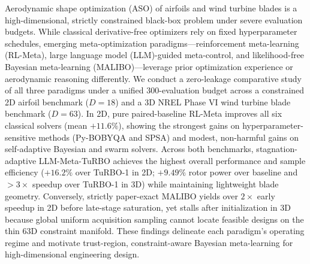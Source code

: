 \documentclass[11pt,fleqn,letterpaper]{article}
\begin{document}
\baselineskip \mybaselineskip
{}

\footnotesize\par{}\par\vspace*{1.2mm}
\baselineskip \mybaselineskip
Aerodynamic shape optimization (ASO) of airfoils and wind turbine blades is a high-dimensional, strictly constrained black-box problem under severe evaluation budgets. While classical derivative-free optimizers rely on fixed hyperparameter schedules, emerging meta-optimization paradigms---reinforcement meta-learning (RL-Meta), large language model (LLM)-guided meta-control, and likelihood-free Bayesian meta-learning (MALIBO)---leverage prior optimization experience or aerodynamic reasoning differently. We conduct a zero-leakage comparative study of all three paradigms under a unified 300-evaluation budget across a constrained 2D airfoil benchmark ($D=18$) and a 3D NREL Phase VI wind turbine blade benchmark ($D=63$). In 2D, pure paired-baseline RL-Meta improves all six classical solvers (mean $+11.6\%$), showing the strongest gains on hyperparameter-sensitive methods (Py-BOBYQA and SPSA) and modest, non-harmful gains on self-adaptive Bayesian and swarm solvers. Across both benchmarks, stagnation-adaptive LLM-Meta-TuRBO achieves the highest overall performance and sample efficiency ($+16.2\%$ over TuRBO-1 in 2D; $+9.49\%$ rotor power over baseline and $>3\times$ speedup over TuRBO-1 in 3D) while maintaining lightweight blade geometry. Conversely, strictly paper-exact MALIBO yields over $2\times$ early speedup in 2D before late-stage saturation, yet stalls after initialization in 3D because global uniform acquisition sampling cannot locate feasible designs on the thin 63D constraint manifold. These findings delineate each paradigm's operating regime and motivate trust-region, constraint-aware Bayesian meta-learning for high-dimensional engineering design.
\end{document}
